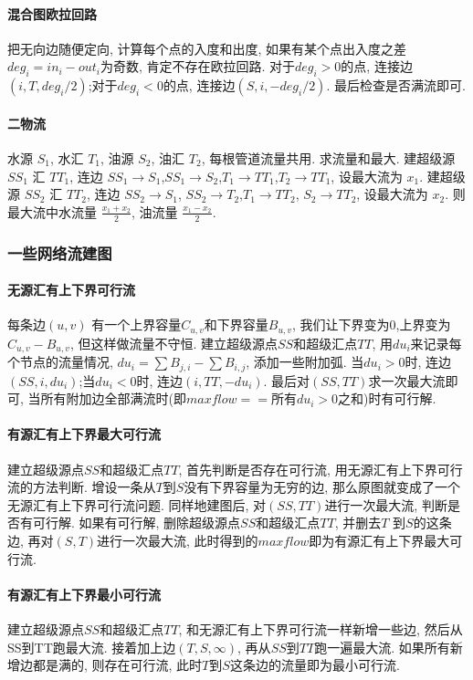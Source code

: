\paragraph{混合图欧拉回路}把无向边随便定向, 计算每个点的入度和出度, 如果有某个点出入度之差$deg_i=in_i-out_i$为奇数, 肯定不存在欧拉回路. 对于$deg_i>0$的点, 连接边$(i,T,deg_i/2)$;对于$deg_i<0$的点, 连接边$(S,i,-deg_i/2)$. 最后检查是否满流即可. 
\paragraph{二物流}
水源 $S_1$, 水汇 $T_1$, 油源 $S_2$, 油汇 $T_2$, 每根管道流量共用. 求流量和最大.
建超级源 $SS_1$ 汇 $TT_1$, 连边 $SS_1\to S_1$,$SS_1\to S_2$,$T_1\to TT_1$,$T_2 \to TT_1$, 设最大流为 $x_1$.
建超级源 $SS_2$ 汇 $TT_2$, 连边 $SS_2 \to S_1$, $SS_2\to T_2$,$T_1\to TT_2$, $S_2\to TT_2$, 设最大流为 $x_2$.
则最大流中水流量 $\frac{x_1 + x_2}{2}$, 油流量 $\frac{x_1-x_2}{2}$.

\subsubsection{一些网络流建图}
\paragraph{无源汇有上下界可行流}
每条边$(u,v)$ 有一个上界容量$C_{u,v}$和下界容量$B_{u,v}$, 我们让下界变为$0$,上界变为$C_{u,v}-B_{u,v}$, 但这样做流量不守恒. 建立超级源点$SS$和超级汇点$TT$, 用$du_i$来记录每个节点的流量情况, $du_i=\sum B_{j,i}-\sum B_{i,j}$, 添加一些附加弧. 当$du_i>0$时, 连边$(SS,i,du_i)$;当$du_i<0$时, 连边$(i,TT,-du_i)$. 最后对$(SS,TT)$求一次最大流即可, 当所有附加边全部满流时(即$maxflow==所有du_i>0之和$)时有可行解. 
\paragraph{有源汇有上下界最大可行流}
建立超级源点$SS$和超级汇点$TT$, 首先判断是否存在可行流, 用无源汇有上下界可行流的方法判断. 增设一条从$T$到$S$没有下界容量为无穷的边, 那么原图就变成了一个无源汇有上下界可行流问题. 同样地建图后, 对$(SS,TT)$进行一次最大流, 判断是否有可行解. 
如果有可行解, 删除超级源点$SS$和超级汇点$TT$, 并删去$T$ 到$S$的这条边, 再对$(S,T)$进行一次最大流, 此时得到的$maxflow$即为有源汇有上下界最大可行流. 
\paragraph{有源汇有上下界最小可行流}
建立超级源点$SS$和超级汇点$TT$, 和无源汇有上下界可行流一样新增一些边, 然后从SS到TT跑最大流. 接着加上边$(T,S,\infty)$, 再从$SS$到$TT$跑一遍最大流. 
如果所有新增边都是满的, 则存在可行流, 此时$T$到$S$这条边的流量即为最小可行流. 
